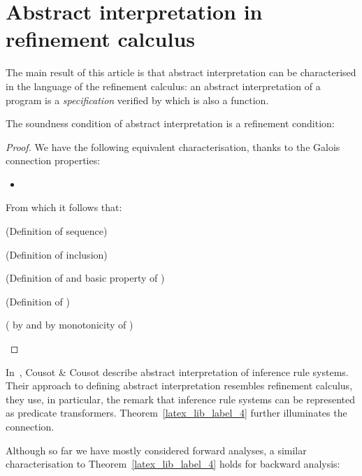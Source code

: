 \documentclass[]{llncs}
\begin{document}
\section{Abstract interpretation in refinement calculus}
\par
The main result of this article is that abstract interpretation can be characterised in the language of the refinement calculus: an abstract interpretation of a program  is a \emph{specification} verified by  which is also a function.
\par
\begin{theorem}
    \label{latex_lib_label_4}The soundness condition of abstract interpretation is a refinement condition:
         
  \end{theorem}
  \begin{proof}
    We have the following equivalent characterisation, thanks to the Galois connection properties:
    \begin{itemize}
      \item 
    \end{itemize}
    From which it follows that:
    \begin{list}{}{}
      \item 
      \item {\small{(Definition of sequence)}}
      \item 
      \item {\small{(Definition of inclusion)}}
      \item 
      \item {\small{(Definition of  and basic property of )}}
      \item 
      \item {\small{(Definition of )}}
      \item 
      \item {\small{( by  and  by monotonicity of )}}
      \item 
    \end{list}
  \end{proof}
\par
In~\cite{Cousot1992a}, Cousot \& Cousot describe abstract interpretation of inference rule systems. Their approach to defining abstract interpretation resembles refinement calculus, they use, in particular, the remark that inference rule systems can be represented as predicate transformers. Theorem~\ref{latex_lib_label_4} further illuminates the connection.
\par
Although so far we have mostly considered forward analyses, a similar characterisation to Theorem~\ref{latex_lib_label_4} holds for backward analysis:
\end{document}
